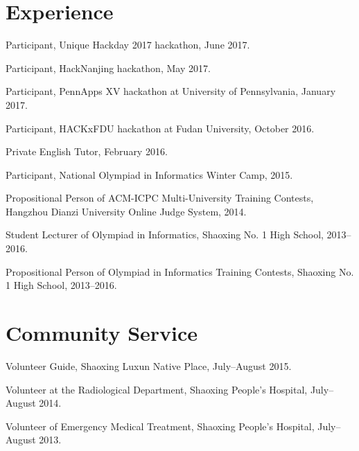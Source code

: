 \documentclass[letterpaper]{article}
\renewenvironment{itemize}{
  \begin{list}{}{
    \setlength{\leftmargin}{1.5em}
  }
}{
  \end{list}
}
\begin{document}
\section*{Experience}

\begin{itemize}
  \item Participant, Unique Hackday 2017 hackathon, June 2017.

  \item Participant, HackNanjing hackathon, May 2017.

  \item Participant, PennApps XV hackathon at University of Pennsylvania, January 2017.

  \item Participant, HACKxFDU hackathon at Fudan University, October 2016.

  \item Private English Tutor, February 2016.

  \item Participant, National Olympiad in Informatics Winter Camp, 2015.

  \item Propositional Person of ACM-ICPC Multi-University Training Contests, Hangzhou Dianzi University Online Judge System, 2014.

  \item Student Lecturer of Olympiad in Informatics, Shaoxing No. 1 High School, 2013--2016.
 
  \item Propositional Person of Olympiad in Informatics Training Contests, Shaoxing No. 1 High School, 2013--2016.
\end{itemize}


\section*{Community Service}

\begin{itemize}
  \item Volunteer Guide, Shaoxing Luxun Native Place, July--August 2015.

  \item Volunteer at the Radiological Department, Shaoxing People's Hospital, July--August 2014.

  \item Volunteer of Emergency Medical Treatment, Shaoxing People's Hospital, July--August 2013.

\end{itemize}
\end{document}
